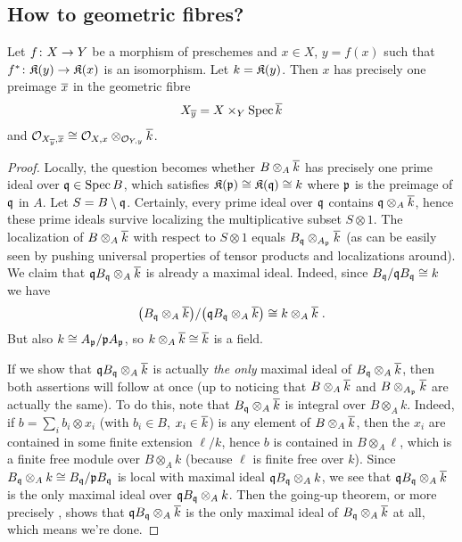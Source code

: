 \documentclass[a4paper,parskip=half,numbers=enddot, DIV=12]{scrreprt}
\begin{document}
\subsection{How to geometric fibres?}
\begin{lem}
	Let $f\colon X\morphism Y$ be a morphism of preschemes and $x\in X$, $y=f(x)$ such that $f^*\colon \KK(y)\morphism\KK(x)$ is an isomorphism. Let $k=\mathfrak{K}(y)$. Then $x$ has precisely one preimage $\overline{x}$ in the geometric fibre
	\begin{align*}
		X_{\overline{y}}=X\times_Y\operatorname{Spec}\overline{k}
	\end{align*}
	and $\mathcal{O}_{X_{\overline{y}},\overline{x}}\cong \mathcal{O}_{X,x}\otimes_{\mathcal{O}_{Y,y}}\overline{k}$. 
\end{lem}
\begin{proof}
	Locally, the question becomes whether $B\otimes_A\overline{k}$ has precisely one prime ideal over $\mathfrak{q}\in\operatorname{Spec} B$, which satisfies $\mathfrak{K}(\mathfrak{p})\cong \mathfrak{K}(\mathfrak{q})\cong k$ where $\mathfrak{p}$ is the preimage of $\mathfrak{q}$ in $A$. Let $S=B\setminus \mathfrak{q}$. Certainly, every prime ideal over $\mathfrak{q}$ contains $\mathfrak{q}\otimes_A\overline{k}$, hence these prime ideals survive localizing the multiplicative subset $S\otimes 1$. The localization of $B\otimes_A\overline{k}$ with respect to $S\otimes 1$ equals $B_{\mathfrak{q}}\otimes_{A_{\mathfrak{p}}}\overline{k}$ (as can be easily seen by pushing universal properties of tensor products and localizations around). We claim that $\mathfrak{q} B_{\mathfrak{q}}\otimes_A\overline{k}$ is already a maximal ideal. Indeed, since $B_{\mathfrak{q}}/\mathfrak{q} B_{\mathfrak{q}}\cong k$ we have
	\begin{align*}
		\big(B_{\mathfrak{q}}\otimes_A\overline{k}\big)/\big(\mathfrak{q} B_{\mathfrak{q}}\otimes_A\overline{k}\big)\cong k\otimes_A\overline{k}\;.
	\end{align*}
	But also $k\cong A_{\mathfrak{p}}/\mathfrak{p} A_{\mathfrak{p}}$, so $k\otimes_A\overline{k}\cong \overline{k}$ is a field.
	
	If we show that $\mathfrak{q} B_{\mathfrak{q}}\otimes_A\overline{k}$ is actually \emph{the only} maximal ideal of $B_{\mathfrak{q}}\otimes_A\overline{k}$, then both assertions will follow at once (up to noticing that $B\otimes_A\overline{k}$ and $B\otimes_{A_{\mathfrak{p}}}\overline{k}$ are actually the same). To do this, note that $B_{\mathfrak{q}}\otimes_A\overline{k}$ is integral over $B\otimes_Ak$. Indeed, if $b=\sum_ib_i\otimes x_i$ (with $b_i\in B$, $x_i\in \overline{k}$) is any element of $B\otimes_A\overline{k}$, then the $x_i$ are contained in some finite extension $\ell/k$, hence $b$ is contained in $B\otimes_A\ell$, which is a finite free module over $B\otimes_Ak$ (because $\ell$ is finite free over $k$). Since $B_{\mathfrak{q}}\otimes_Ak\cong B_{\mathfrak{q}}/\mathfrak{p} B_{\mathfrak{q}}$ is local with maximal ideal $\mathfrak{q} B_{\mathfrak{q}}\otimes_Ak$, we see that $\mathfrak{q} B_{\mathfrak{q}}\otimes_A\overline{k}$ is the only maximal ideal over $\mathfrak{q} B_{\mathfrak{q}}\otimes_Ak$. Then the going-up theorem, or more precisely \cite[Theorem~7]{alg1}, shows that $\mathfrak{q} B_{\mathfrak{q}}\otimes_A\overline{k}$ is the only maximal ideal of $B_{\mathfrak{q}}\otimes_A\overline{k}$ at all, which means we're done.
\end{proof}
\end{document}
